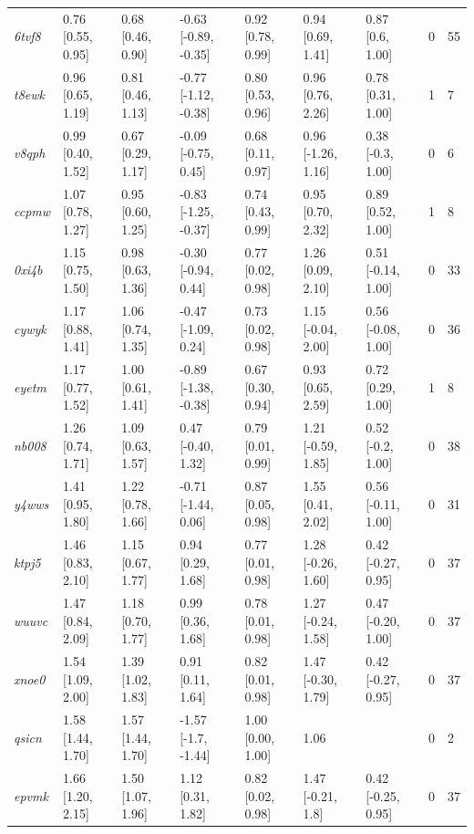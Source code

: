 \documentclass[9pt,lineno,final]{elife}
\begin{document}
\begin{table}[tb!]
\begin{center}
\begin{threeparttable}
\begin{tabular}{@{}lllllllll@{}}
\textit{6tvf8} & 0.76 [0.55, 0.95] & 0.68 [0.46, 0.90] & -0.63 [-0.89, -0.35] & 0.92 [0.78, 0.99] & 0.94 [0.69, 1.41] & 0.87 [0.6, 1.00] & 0 & 55 \\
\textit{t8ewk} & 0.96 [0.65, 1.19] & 0.81 [0.46, 1.13] & -0.77 [-1.12, -0.38] & 0.80 [0.53, 0.96] & 0.96 [0.76, 2.26] & 0.78 [0.31, 1.00] & 1 & 7 \\
\textit{v8qph} & 0.99 [0.40, 1.52] & 0.67 [0.29, 1.17] & -0.09 [-0.75, 0.45] & 0.68 [0.11, 0.97] & 0.96 [-1.26, 1.16] & 0.38 [-0.3, 1.00] & 0 & 6 \\
\textit{ccpmw} & 1.07 [0.78, 1.27] & 0.95 [0.60, 1.25] & -0.83 [-1.25, -0.37] & 0.74 [0.43, 0.99] & 0.95 [0.70, 2.32] & 0.89 [0.52, 1.00] & 1 & 8 \\
\textit{0xi4b} & 1.15 [0.75, 1.50] & 0.98 [0.63, 1.36] & -0.30 [-0.94, 0.44] & 0.77 [0.02, 0.98] & 1.26 [0.09, 2.10] & 0.51 [-0.14, 1.00] & 0 & 33 \\
\textit{cywyk} & 1.17 [0.88, 1.41] & 1.06 [0.74, 1.35] & -0.47 [-1.09, 0.24] & 0.73 [0.02, 0.98] & 1.15 [-0.04, 2.00] & 0.56 [-0.08, 1.00] & 0 & 36 \\
\textit{eyetm} & 1.17 [0.77, 1.52] & 1.00 [0.61, 1.41] & -0.89 [-1.38, -0.38] & 0.67 [0.30, 0.94] & 0.93 [0.65, 2.59] & 0.72 [0.29, 1.00] & 1 & 8 \\
\textit{nb008} & 1.26 [0.74, 1.71] & 1.09 [0.63, 1.57] & 0.47 [-0.40, 1.32] & 0.79 [0.01, 0.99] & 1.21 [-0.59, 1.85] & 0.52 [-0.2, 1.00] & 0 & 38 \\
\textit{y4wws} & 1.41 [0.95, 1.80] & 1.22 [0.78, 1.66] & -0.71 [-1.44, 0.06] & 0.87 [0.05, 0.98] & 1.55 [0.41, 2.02] & 0.56 [-0.11, 1.00] & 0 & 31 \\
\textit{ktpj5} & 1.46 [0.83, 2.10] & 1.15 [0.67, 1.77] & 0.94 [0.29, 1.68] & 0.77 [0.01, 0.98] & 1.28 [-0.26, 1.60] & 0.42 [-0.27, 0.95] & 0 & 37 \\
\textit{wuuvc} & 1.47 [0.84, 2.09] & 1.18 [0.70, 1.77] & 0.99 [0.36, 1.68] & 0.78 [0.01, 0.98] & 1.27 [-0.24, 1.58] & 0.47 [-0.20, 1.00] & 0 & 37 \\
\textit{xnoe0} & 1.54 [1.09, 2.00] & 1.39 [1.02, 1.83] & 0.91 [0.11, 1.64] & 0.82 [0.01, 0.98] & 1.47 [-0.30, 1.79] & 0.42 [-0.27, 0.95] & 0 & 37 \\
\textit{qsicn} & 1.58 [1.44, 1.70] & 1.57 [1.44, 1.70] & -1.57 [-1.7, -1.44] & 1.00 [0.00, 1.00] & 1.06 &  & 0 & 2 \\
\textit{epvmk} & 1.66 [1.20, 2.15] & 1.50 [1.07, 1.96] & 1.12 [0.31, 1.82] & 0.82 [0.02, 0.98] & 1.47 [-0.21, 1.8] & 0.42 [-0.25, 0.95] & 0 & 37 \\

\end{tabular}
\end{threeparttable}
\end{center}
\end{table}
\end{document}
